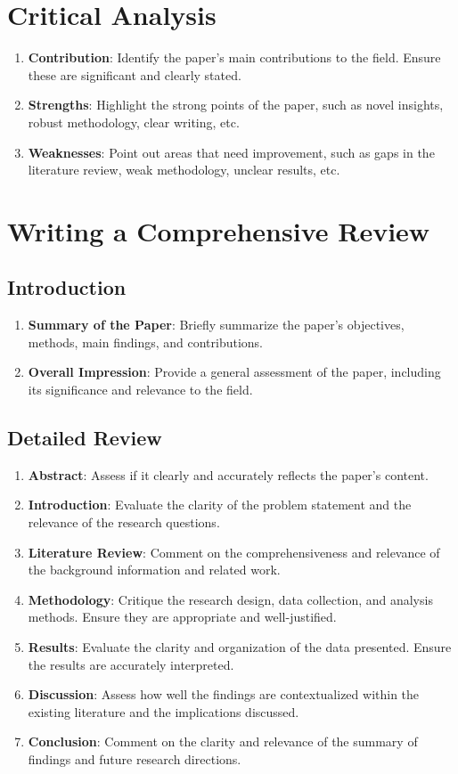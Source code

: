 \documentclass[12pt]{article}
\begin{document}
\section{Critical Analysis}
\begin{enumerate}
    \item \textbf{Contribution}: Identify the paper's main contributions to the field. Ensure these are significant and clearly stated.
    \item \textbf{Strengths}: Highlight the strong points of the paper, such as novel insights, robust methodology, clear writing, etc.
    \item \textbf{Weaknesses}: Point out areas that need improvement, such as gaps in the literature review, weak methodology, unclear results, etc.
\end{enumerate}

\section{Writing a Comprehensive Review}

\subsection{Introduction}
\begin{enumerate}
    \item \textbf{Summary of the Paper}: Briefly summarize the paper’s objectives, methods, main findings, and contributions.
    \item \textbf{Overall Impression}: Provide a general assessment of the paper, including its significance and relevance to the field.
\end{enumerate}

\subsection{Detailed Review}
\begin{enumerate}
    \item \textbf{Abstract}: Assess if it clearly and accurately reflects the paper’s content.
    \item \textbf{Introduction}: Evaluate the clarity of the problem statement and the relevance of the research questions.
    \item \textbf{Literature Review}: Comment on the comprehensiveness and relevance of the background information and related work.
    \item \textbf{Methodology}: Critique the research design, data collection, and analysis methods. Ensure they are appropriate and well-justified.
    \item \textbf{Results}: Evaluate the clarity and organization of the data presented. Ensure the results are accurately interpreted.
    \item \textbf{Discussion}: Assess how well the findings are contextualized within the existing literature and the implications discussed.
    \item \textbf{Conclusion}: Comment on the clarity and relevance of the summary of findings and future research directions.
\end{enumerate}
\end{document}
